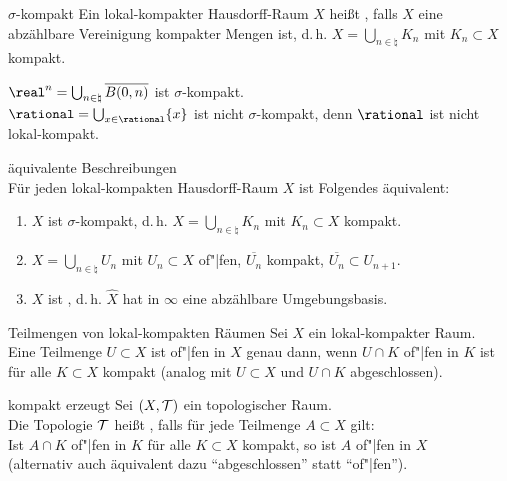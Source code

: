 \linie

\begin{Def}{$\sigma$-kompakt}
    Ein lokal-kompakter Hausdorff-Raum $X$ heißt ,
    falls $X$ eine abzählbare Vereinigung kompakter Mengen ist, d.\,h.
    $X = \bigcup_{n \in \natural} K_n$ mit $K_n \subset X$ kompakt.
\end{Def}

\begin{Bsp}
    $\real^n = \bigcup_{n \in \natural} \abschluss{B(0, n)}$ ist
    $\sigma$-kompakt. \\
    $\rational = \bigcup_{x \in \rational} \{x\}$ ist nicht $\sigma$-kompakt,
    denn $\rational$ ist nicht lokal-kompakt.
\end{Bsp}

\begin{Satz}{äquivalente Beschreibungen}\\
    Für jeden lokal-kompakten Hausdorff-Raum $X$ ist Folgendes äquivalent:
    \begin{enumerate}
        \item
        $X$ ist $\sigma$-kompakt, d.\,h. $X = \bigcup_{n \in \natural} K_n$ mit
        $K_n \subset X$ kompakt.

        \item
        $X = \bigcup_{n \in \natural} U_n$ mit $U_n \subset X$ of"|fen,
        $\overline{U_n}$ kompakt, $\overline{U_n} \subset U_{n+1}$.

        \item
        $X$ ist , d.\,h.
        $\widehat{X}$ hat in $\infty$ eine abzählbare Umgebungsbasis.
    \end{enumerate}
\end{Satz}

\linie

\begin{Satz}{Teilmengen von lokal-kompakten Räumen}
    Sei $X$ ein lokal-kompakter Raum. \\
    Eine Teilmenge $U \subset X$ ist of"|fen in $X$ genau dann, wenn
    $U \cap K$ of"|fen in $K$ ist für alle $K \subset X$ kompakt
    (analog mit $U \subset X$ und $U \cap K$ abgeschlossen).
\end{Satz}

\begin{Def}{kompakt erzeugt}
    Sei $(X, \mathcal{T})$ ein topologischer Raum. \\
    Die Topologie $\mathcal{T}$ heißt , falls für jede
    Teilmenge $A \subset X$ gilt: \\
    Ist $A \cap K$ of"|fen in $K$ für alle $K \subset X$ kompakt,
    so ist $A$ of"|fen in $X$ \\
    (alternativ auch äquivalent dazu "`abgeschlossen"' statt "`of"|fen"').
\end{Def}

